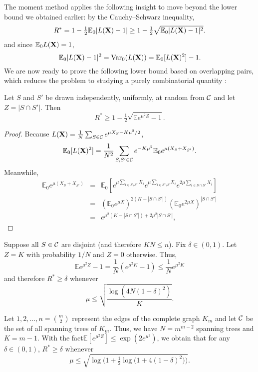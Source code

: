 \documentclass[10pt, oneside]{article}
\begin{document}
The moment method applies the following insight to move beyond the lower bound we obtained earlier: by the Cauchy--Schwarz inequality,
%
\[
R^* = 1 - \tfrac{1}{2} \mathbb{E}_0 |L(\mathbf{X})-1|
\ge1 - \tfrac{1}{2} \sqrt{\mathbb{E}_0 |L(\mathbf{X})-1|^2}.
\]
and since $\mathbb{E}_0 L(\mathbf{X}) = 1$,
\[
\mathbb{E}_0 |L(\mathbf{X})-1|^2=\operatorname{Var}_0(L(\mathbf{X})) = \mathbb{E}_0 [L(\mathbf{X})^2] -1.
\]
We are now ready to prove the following lower bound based on overlapping pairs, which reduces the problem to
studying a purely combinatorial quantity \cite{arias2008searching,addario2010combinatorial}:
\begin{prop}
  \label{prop:pairs}
  Let $S$ and $S'$ be drawn independently, uniformly, at random from ${\mathcal C}$
  and let $Z=|S\cap S'|$. Then
  \[
  R^* \ge1- \tfrac{1}{2} \sqrt{\mathbb{E} e^{\mu^2 Z} -1}.
  \]
\end{prop}
\begin{proof}
Because $L(\mathbf{X})= \frac1 N \sum_{S\in{\mathcal C}} e^{\mu X_S -K\mu^2/2}$, 
\[
\mathbb{E}_0 [L(\mathbf{X})^2]
=
\frac{1}{N^2} \sum_{S,S'\in{\mathcal C}} e^{-K \mu^2} \mathbb{E}_0 e^{\mu(X_S+X_{S'})}.
\]
Meanwhile,
\begin{eqnarray*}
\mathbb{E}_0 e^{\mu(X_S+X_{S'})}
& = &
\mathbb{E}_0 [ e^{\mu\sum_{i\in S\setminus S'} X_i} e^{\mu\sum_{i\in
S'\setminus S} X_i}
e^{2\mu\sum_{i\in S\cap S'} X_i} ] \\
& = &
(\mathbb{E}_0 e^{\mu X} )^{2(K-|S\cap S'|)} (\mathbb{E}_0 e^{2\mu X}
)^{|S\cap S'|}
\\
& = &
e^{\mu^2 (K-|S\cap S'|)+2\mu^2|S\cap S'|},
\end{eqnarray*}
\end{proof}

\begin{exmp}
  Suppose all $S\in{\mathcal C}$ are disjoint (and therefore $KN\le n$). Fix $\delta\in(0,1)$. Let $Z = K$ with probability $1/N$ and $Z = 0$ otherwise. Thus,
  \[
  \mathbb{E} e^{\mu^2Z} -1 = \frac{1}{N} (e^{\mu^2 K} -1 )
  \le\frac{1}{N} e^{\mu^2 K}
  \]
  and therefore $R^* \ge\delta$ whenever
  \[
  \mu\le\sqrt{\frac{\log(4N(1-\delta)^2)}{K}}.
  \]
\end{exmp}

\begin{exmp}
  \label{exmp:Spanning Trees}
Let $1,2,\ldots,n={m\choose2}$ represent the edges of the complete graph $K_m$ and let ${\mathcal C}$ be the set of all spanning trees of $K_m$.
Thus, we have $N=m^{m-2}$ spanning trees and $K=m-1$. With the fact$\mathbb{E}[ e^{\mu^2 Z} ] \le \exp(2e^{\mu^2 })$, we obtain that for any $\delta\in(0,1)$,
$R^* \ge\delta$ whenever
\[
\mu\le\sqrt{\log\bigl(1+\tfrac1 2 \log\bigl(1+4(1-\delta)^2\bigr) \bigr)}.
\]
\end{exmp}
\end{document}
